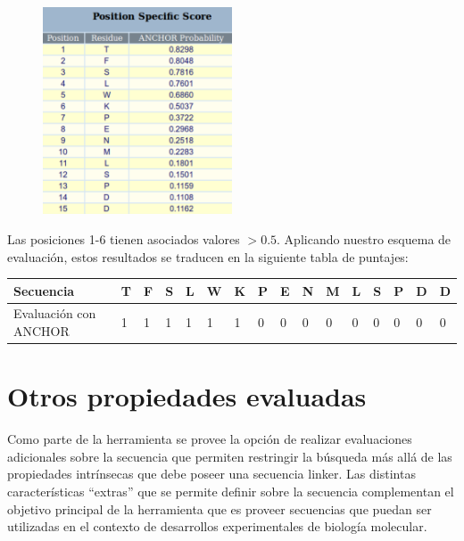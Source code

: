 \begin{figure}[ht]
\centering
\includegraphics[width=0.5\textwidth]{img/anchorTabla.png} 
\caption{}
\label{anchorResults}
\end{figure}

Las posiciones 1-6 tienen asociados valores $>0.5$. Aplicando nuestro esquema de evaluación, estos resultados se traducen en la siguiente tabla de puntajes:

\vspace{0.5cm}
\noindent
\begin{tabular}{llllllllllllllll} 
\hline      
Secuencia & \textbf{T} & \textbf{F} & \textbf{S} & \textbf{L} & \textbf{W} & \textbf{K} & \textbf{P} & \textbf{E} & \textbf{N} & \textbf{M} & \textbf{L} & \textbf{S} & \textbf{P} & \textbf{D} & \textbf{D} \\ \hline
Evaluación con ANCHOR & 1 & 1 & 1 & 1 & 1 & 1 & 0 & 0 & 0 & 0 & 0 & 0 & 0 & 0 & 0\\ \hline
\end{tabular}


















\section{Otros propiedades evaluadas}

Como parte de la herramienta se provee la opción de realizar evaluaciones adicionales sobre la secuencia que permiten restringir la búsqueda más allá de las propiedades intrínsecas que debe poseer una secuencia linker.
Las distintas características ``extras'' que se permite definir sobre la secuencia complementan el objetivo principal de la herramienta que es proveer secuencias que puedan ser utilizadas 
en el contexto de desarrollos experimentales de biología molecular.

